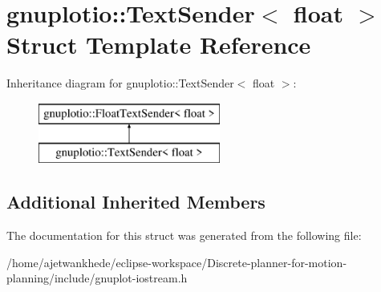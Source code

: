 \hypertarget{structgnuplotio_1_1TextSender_3_01float_01_4}{}\section{gnuplotio\+:\+:Text\+Sender$<$ float $>$ Struct Template Reference}
\label{structgnuplotio_1_1TextSender_3_01float_01_4}
Inheritance diagram for gnuplotio\+:\+:Text\+Sender$<$ float $>$\+:\begin{figure}[H]
\begin{center}
\leavevmode
\includegraphics[height=2.000000cm]{structgnuplotio_1_1TextSender_3_01float_01_4}
\end{center}
\end{figure}
\subsection*{Additional Inherited Members}


The documentation for this struct was generated from the following file\+:\begin{DoxyCompactItemize}
\item 
/home/ajetwankhede/eclipse-\/workspace/\+Discrete-\/planner-\/for-\/motion-\/planning/include/gnuplot-\/iostream.\+h\end{DoxyCompactItemize}
